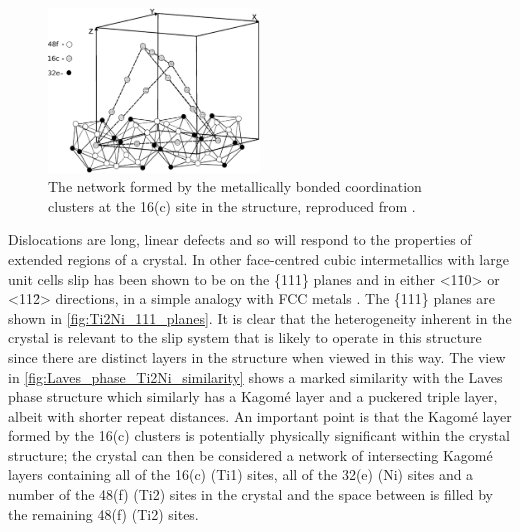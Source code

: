\begin{figure}
\centering
\includegraphics[width=0.5\textwidth]{Ti2Ni_16c_sites}
\caption[The Kagom\'{e} network formed by atomic clusters around the 16(c) site.]{The network formed by the metallically bonded coordination clusters at the 16(c) site in the  structure, reproduced from \cite{Ivanovic2006}.\label{fig:16c_network_Ti2Ni}}
\end{figure}


Dislocations are long, linear defects and so will respond to the properties of extended regions of a crystal. In other face-centred cubic intermetallics with large unit cells slip has been shown to be on the \{111\} planes and in either <1\={1}0> or <11\={2}> directions, in a simple analogy with FCC metals \cite{Davis2015}. The \{111\} planes are shown in \autoref{fig:Ti2Ni_111_planes}. It is clear that the heterogeneity inherent in the crystal is relevant to the slip system that is likely to operate in this structure since there are distinct layers in the structure when viewed in this way. The view in \autoref{fig:Laves_phase_Ti2Ni_similarity} shows a marked similarity with the Laves phase structure which similarly has a Kagom\'{e} layer and a puckered triple layer, albeit with shorter repeat distances. An important point is that the Kagom\'{e} layer formed by the 16(c) clusters is potentially physically significant within the crystal structure; the crystal can then be considered a network of intersecting Kagom\'e layers containing all of the 16(c) (Ti1) sites, all of the 32(e) (Ni) sites and a number of the 48(f) (Ti2) sites in the crystal and the space between is filled by the remaining 48(f) (Ti2) sites.


